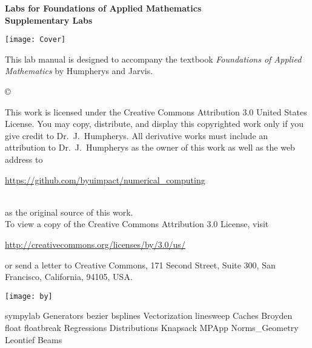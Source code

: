 \documentclass[nociteref]{SIAM-GH-book}
\begin{document}



\thispagestyle{empty}
\begin{center}

{\huge \bf Labs for Foundations of Applied Mathematics} \\
\vspace{5mm}
{\Large \bf Supplementary Labs}
\vspace{20mm}

\texttt{[image: Cover]}
\end{center}
\frontmatter




\begin{thepreface}
This lab manual is designed to accompany the textbook \emph{Foundations of Applied Mathematics} by Humpherys and Jarvis.

\vfill
\copyright{This work is licensed under the Creative Commons Attribution 3.0 United States
License.  You may copy, distribute, and display this copyrighted work only if you give
credit to Dr.~J.~Humpherys. All derivative works must include an attribution to Dr.~J.~Humpherys as the owner of this work as well as the web address to
\\\centerline{\url{https://github.com/byuimpact/numerical_computing}}\\ as the original source of
this
work.\\To view a copy of the Creative Commons Attribution 3.0 License,
visit\\\centerline{\url{http://creativecommons.org/licenses/by/3.0/us/}} or send a letter to
Creative Commons, 171 Second Street, Suite 300, San Francisco, California, 94105, USA.}

\vfill
\centering\texttt{[image: by]}
\vfill
\end{thepreface}

\setcounter{tocdepth}{1}
\tableofcontents

\mainmatter
{sympylab}
{Generators}
{bezier}
{bsplines}
{Vectorization}
{linesweep}
{Caches}
{Broyden}
{float}
{floatbreak}
{Regressions}
{Distributions}
{Knapsack}
{MPApp}
{Norms_Geometry}
{Leontief}
{Beams}
\end{document}
